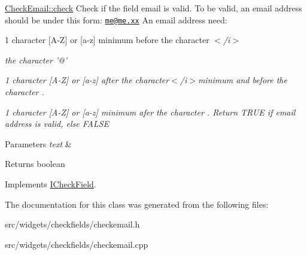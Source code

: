 \hyperlink{classCheckEmail_a544d7656d36bd463391fe2f4dd3e13c6}{Check\+Email\+::check} Check if the field email is valid. To be valid, an email address should be under this form\+: \href{mailto:me@me.xx}{\tt me@me.\+xx} An email address need\+: 


\begin{DoxyItemize}
\item 1 character \mbox{[}A-\/\+Z\mbox{]} or \mbox{[}a-\/z\mbox{]} minimum before the character {\itshape $<$/i$>$}
\item {\itshape the character '@'}
\item {\itshape 1 character \mbox{[}A-\/\+Z\mbox{]} or \mbox{[}a-\/z\mbox{]} after the character{\itshape $<$/i$>$minimum and before the character {\itshape .}}}
\item {\itshape {\itshape 1 character \mbox{[}A-\/\+Z\mbox{]} or \mbox{[}a-\/z\mbox{]} minimum afer the character {\itshape .} Return T\+R\+U\+E if email address is valid, else F\+A\+L\+S\+E 
\begin{DoxyParams}{Parameters}
{\em text} & \\
\hline
\end{DoxyParams}
\begin{DoxyReturn}{Returns}
boolean 
\end{DoxyReturn}
}}
\end{DoxyItemize}

Implements \hyperlink{classICheckField_a6bd42b4d49c165cdd92822135123fd4b}{I\+Check\+Field}.



The documentation for this class was generated from the following files\+:\begin{DoxyCompactItemize}
\item 
src/widgets/checkfields/checkemail.\+h\item 
src/widgets/checkfields/checkemail.\+cpp\end{DoxyCompactItemize}
